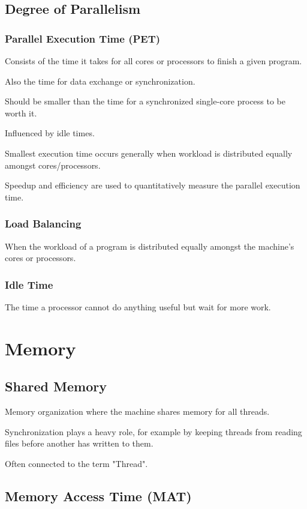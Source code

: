 \documentclass{article}
\begin{document}
\subsection{Degree of Parallelism}
\subsubsection{Parallel Execution Time (PET)}

Consists of the time it takes for all cores or processors to finish a given program.

Also the time for data exchange or synchronization.

Should be smaller than the time for a synchronized single-core process to be worth it.

Influenced by idle times.

Smallest execution time occurs generally when workload is distributed equally amongst cores/processors.

Speedup and efficiency are used to quantitatively measure the parallel execution time.

\subsubsection{Load Balancing}

When the workload of a program is distributed equally amongst the machine's cores or processors.

\subsubsection{Idle Time}

The time a processor cannot do anything useful but wait for more work.

\section{Memory}
\subsection{Shared Memory}

Memory organization where the machine shares memory for all threads.

Synchronization plays a heavy role, for example by keeping threads from reading files before another has written to them.

Often connected to the term "Thread".

\subsection{Memory Access Time (MAT)}
\end{document}
